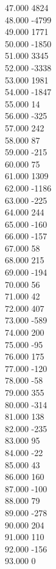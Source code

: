 { 47.000	4824 \\
 48.000	-4799 \\
 49.000	1771 \\
 50.000	-1850 \\
 51.000	3345 \\
 52.000	-3338 \\
 53.000	1981 \\
 54.000	-1847 \\
 55.000	14 \\
 56.000	-325 \\
 57.000	242 \\
 58.000	87 \\
 59.000	-215 \\
 60.000	75 \\
 61.000	1309 \\
 62.000	-1186 \\
 63.000	-225 \\
 64.000	244 \\
 65.000	-160 \\
 66.000	-157 \\
 67.000	58 \\
 68.000	215 \\
 69.000	-194 \\
 70.000	56 \\
 71.000	42 \\
 72.000	407 \\
 73.000	-589 \\
 74.000	200 \\
 75.000	-95 \\
 76.000	175 \\
 77.000	-120 \\
 78.000	-58 \\
 79.000	355 \\
 80.000	-314 \\
 81.000	138 \\
 82.000	-235 \\
 83.000	95 \\
 84.000	-22 \\
 85.000	43 \\
 86.000	160 \\
 87.000	-100 \\
 88.000	79 \\
 89.000	-278 \\
 90.000	204 \\
 91.000	110 \\
 92.000	-156 \\
 93.000	0 \\
}
